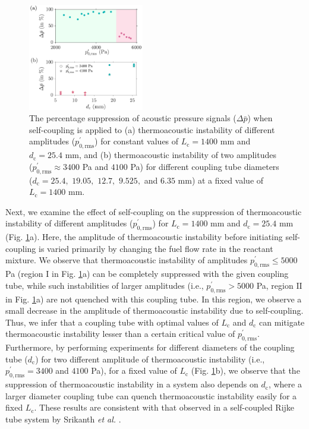 \documentclass[twocolumn,10pt]{article} %
\begin{document}
\begin{figure}[t!]
\centering
\includegraphics[width=0.45\textwidth]{diff_TAI_amp..png}
\caption{The percentage suppression of acoustic pressure signals ($\Delta \bar{p}$) when self-coupling is applied to (a) thermoacoustic instability of different amplitudes ($p^\prime_{0,\text{rms}}$) for constant values of $L_{\text{c}} = 1400$ mm and $d_{\text{c}} = 25.4$ mm, and (b) thermoacoustic instability of two amplitudes  ($p^\prime_{0,\text{rms}} \approx 3400$ Pa and $4100$ Pa) for different coupling tube diameters ($d_{\text{c}} = 25.4,$ $19.05,$ $12.7,$ $9.525,$ and $6.35$ mm) at a fixed value of $L_{\text{c}} = 1400$ mm.}
\label{diff_amp_dia}
\end{figure}

Next, we examine the effect of self-coupling on the suppression of  thermoacoustic instability of different amplitudes ($p^\prime_{0,\text{rms}}$) for $L_{\text{c}}=1400$ mm and $d_{\text{c}}=25.4$ mm (Fig. \ref{diff_amp_dia}a). Here, the amplitude of thermoacoustic instability before initiating self-coupling is varied primarily by changing the fuel flow rate in the reactant mixture. We observe that thermoacoustic instability of amplitudes $p^\prime_{0,\text{rms}} \leq 5000$ Pa (region $\text{I}$ in Fig. \ref{diff_amp_dia}a) can be completely suppressed with the given coupling tube, while such instabilities of larger amplitudes (i.e., $p^\prime_{0,\text{rms}} > 5000$ Pa, region $\text{II}$ in Fig. \ref{diff_amp_dia}a) are not quenched with this coupling tube. In this region, we observe a small decrease in the amplitude of thermoacoustic instability due to self-coupling. Thus, we infer that a coupling tube with optimal values of $L_{\text{c}}$ and $d_{\text{c}}$ can mitigate thermoacoustic instability lesser than a certain critical value of $p^\prime_{0,\text{rms}}$. Furthermore, by performing experiments for different diameters of the coupling tube ($d_{\text{c}}$) for two different amplitude of thermoacoustic instability (i.e., $p^\prime_{0,\text{rms}} = 3400$ and $4100$ Pa), for a fixed value of $L_{\text{c}}$ (Fig. \ref{diff_amp_dia}b), we observe that the suppression of thermoacoustic instability in a system also depends on $d_{\text{c}}$, where a larger diameter coupling tube can quench thermoacoustic instability easily for a fixed $L_{\text{c}}$. These results are consistent with that observed in a self-coupled Rijke tube system by Srikanth \textit{et al.} \cite{srikanth2021selfcoupling}.
\end{document}
